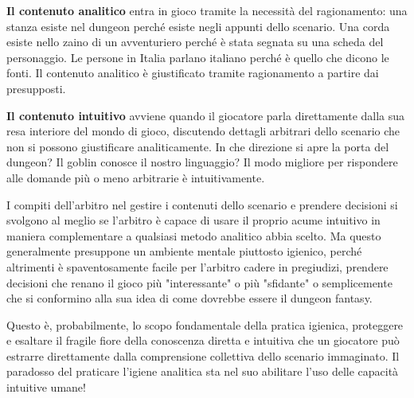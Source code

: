 \textbf{Il contenuto analitico} entra in gioco tramite la necessità del ragionamento: una stanza esiste nel dungeon perché esiste negli appunti dello scenario. Una corda esiste nello zaino di un avventuriero perché è stata segnata su una scheda del personaggio. Le persone in Italia parlano italiano perché è quello che dicono le fonti. Il contenuto analitico è giustificato tramite ragionamento a partire dai presupposti.

\textbf{Il contenuto intuitivo} avviene quando il giocatore parla direttamente dalla sua resa interiore del mondo di gioco, discutendo dettagli arbitrari dello scenario che non si possono giustificare analiticamente. In che direzione si apre la porta del dungeon? Il goblin conosce il nostro linguaggio? Il modo migliore per rispondere alle domande più o meno arbitrarie è intuitivamente.

I compiti dell'arbitro nel gestire i contenuti dello scenario e prendere decisioni si svolgono al meglio se l'arbitro è capace di usare il proprio acume intuitivo in maniera complementare a qualsiasi metodo analitico abbia scelto. Ma questo generalmente presuppone un ambiente mentale piuttosto igienico, perché altrimenti è spaventosamente facile per l'arbitro cadere in pregiudizi, prendere decisioni che renano il gioco più "interessante"  o più "sfidante" o semplicemente che si conformino alla sua idea di come dovrebbe essere il dungeon fantasy.

Questo è, probabilmente, lo scopo fondamentale della pratica igienica, proteggere e esaltare il fragile fiore della conoscenza diretta e intuitiva che un giocatore può estrarre direttamente dalla comprensione collettiva dello scenario immaginato. Il paradosso del praticare l'igiene analitica sta nel suo abilitare l'uso delle capacità intuitive umane!

\clearpage